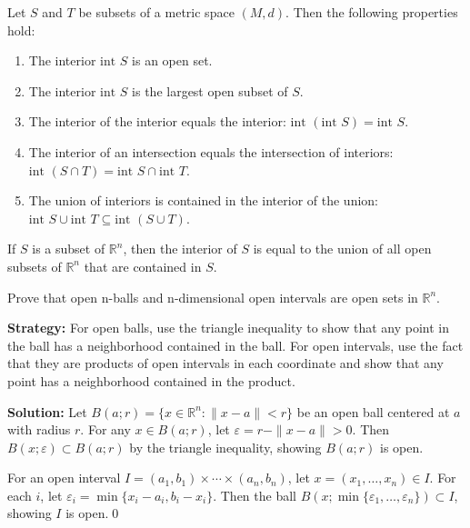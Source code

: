\begin{theorem}
Let $S$ and $T$ be subsets of a metric space $(M,d)$. Then the following properties hold:
\begin{enumerate}
\item The interior $\text{int } S$ is an open set.
\item The interior $\text{int } S$ is the largest open subset of $S$.
\item The interior of the interior equals the interior: $\text{int }(\text{int } S) = \text{int } S$.
\item The interior of an intersection equals the intersection of interiors: $\text{int }(S \cap T) = \text{int } S \cap \text{int } T$.
\item The union of interiors is contained in the interior of the union: $\text{int } S \cup \text{int } T \subseteq \text{int }(S \cup T)$.
\end{enumerate}
\end{theorem}

\begin{theorem}
If $S$ is a subset of $\mathbb{R}^n$, then the interior of $S$ is equal to the union of all open subsets of $\mathbb{R}^n$ that are contained in $S$.
\end{theorem}



\begin{problembox}
\begin{problemstatement}
Prove that open n-balls and n-dimensional open intervals are open sets in $\mathbb{R}^n$.
\end{problemstatement}
\end{problembox}

\noindent\textbf{Strategy:} For open balls, use the triangle inequality to show that any point in the ball has a neighborhood contained in the ball. For open intervals, use the fact that they are products of open intervals in each coordinate and show that any point has a neighborhood contained in the product.

\bigskip\noindent\textbf{Solution:} Let $B(a;r) = \{x \in \mathbb{R}^n : \|x-a\| < r\}$ be an open ball centered at $a$ with radius $r$. For any $x \in B(a;r)$, let $\varepsilon = r - \|x-a\| > 0$. Then $B(x;\varepsilon) \subset B(a;r)$ by the triangle inequality, showing $B(a;r)$ is open.

For an open interval $I = (a_1,b_1) \times \cdots \times (a_n,b_n)$, let $x = (x_1,\ldots,x_n) \in I$. For each $i$, let $\varepsilon_i = \min\{x_i - a_i, b_i - x_i\}$. Then the ball $B(x;\min\{\varepsilon_1,\ldots,\varepsilon_n\}) \subset I$, showing $I$ is open.\qed


